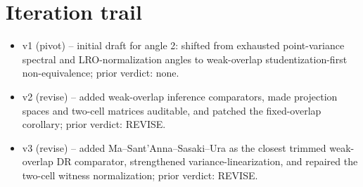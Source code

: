 \documentclass[11pt]{article}
\theoremstyle{definition}
\theoremstyle{plain}
\theoremstyle{remark}
\begin{document}
\section{Iteration trail}
\begin{itemize}[leftmargin=*]
\item v1 (pivot) -- initial draft for angle 2: shifted from exhausted point-variance spectral and LRO-normalization angles to weak-overlap studentization-first non-equivalence; prior verdict: none.
\item v2 (revise) -- added weak-overlap inference comparators, made projection spaces and two-cell matrices auditable, and patched the fixed-overlap corollary; prior verdict: REVISE.
\item v3 (revise) -- added Ma--Sant'Anna--Sasaki--Ura as the closest trimmed weak-overlap DR comparator, strengthened variance-linearization, and repaired the two-cell witness normalization; prior verdict: REVISE.
\end{itemize}
\end{document}
